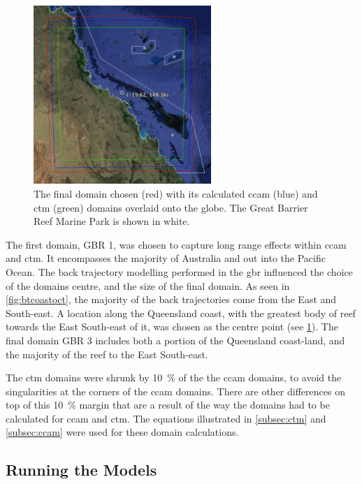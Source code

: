 \begin{figure}[!htb]
    \centering
    \includegraphics[width=0.6\textwidth,natwidth=1206,natheight=1210]{Fig/Research/EarthDomain.png}
    \caption{The final domain chosen (red) with its calculated \gls{ccam} (blue) and \gls{ctm} (green) domains overlaid onto the globe. The Great Barrier Reef Marine Park is shown in white.}
    \label{fig:earthdomain}
\end{figure}

The first domain, GBR 1, was chosen to capture long range effects within \gls{ccam} and \gls{ctm}. It encompasses the majority of Australia and out into the Pacific Ocean. The back trajectory modelling performed in the \gls{gbr} influenced the choice of the domains centre, and the size of the final domain. As seen in \cref{fig:btcoastoct}, the majority of the back trajectories come from the East and South-east. A location along the Queensland coast, with the greatest body of reef towards the East South-east of it, was chosen as the centre point (see \cref{fig:earthdomain}). The final domain GBR 3 includes both a portion of the Queensland coast-land, and the majority of the reef to the East South-east.

The \gls{ctm} domains were shrunk by \SI{10}{\percent} of the the \gls{ccam} domains, to avoid the singularities at the corners of the \gls{ccam} domains. There are other differences on top of this \SI{10}{\percent} margin that are a result of the way the domains had to be calculated for \gls{ccam} and \gls{ctm}. The equations illustrated in \cref{subsec:ctm} and \cref{subsec:ccam} were used for these domain calculations.

\subsection{Running the Models}
\label{subsec:runmodel}

